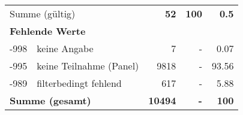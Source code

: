 \begin{longtable}{lXrrr}
     \midrule
     \multicolumn{2}{l}{Summe (gültig)} &
       \textbf{\num{52}} &
     \textbf{100} &
       \textbf{\num[round-mode=places,round-precision=2]{0,5}} \\
     \multicolumn{5}{l}{\textbf{Fehlende Werte}}\\
       -998 &
       keine Angabe &
         \num{7} &
        - &
         \num[round-mode=places,round-precision=2]{0,07} \\
       -995 &
       keine Teilnahme (Panel) &
         \num{9818} &
        - &
         \num[round-mode=places,round-precision=2]{93,56} \\
       -989 &
       filterbedingt fehlend &
         \num{617} &
        - &
         \num[round-mode=places,round-precision=2]{5,88} \\
     \midrule
     \multicolumn{2}{l}{\textbf{Summe (gesamt)}} &
          \textbf{\num{10494}} &
        \textbf{-} &
        \textbf{100} \\
     \bottomrule
     \end{longtable}
     

